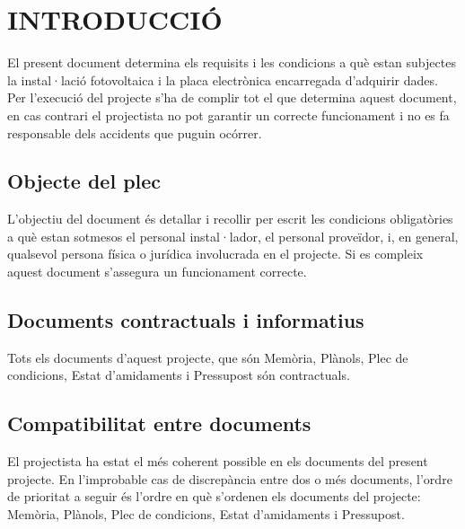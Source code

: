 \chapter{\uppercase{Introducció}}
El present document determina els requisits i les condicions a què estan subjectes la instal·lació fotovoltaica i la placa electrònica encarregada d'adquirir dades. Per l'execució del projecte s'ha de complir tot el que determina aquest document, en cas contrari el projectista no pot garantir un correcte funcionament i no es fa responsable dels accidents que puguin ocórrer.

\section{Objecte del plec}
L'objectiu del document és detallar i recollir per escrit les condicions obligatòries a què estan sotmesos el personal instal·lador, el personal proveïdor, i, en general, qualsevol persona física o jurídica involucrada en el projecte. Si es compleix aquest document s'assegura un funcionament correcte.


\section{Documents contractuals i informatius}
Tots els documents d'aquest projecte, que són Memòria, Plànols, Plec de condicions, Estat d'amidaments i Pressupost són contractuals. 


\section{Compatibilitat entre documents} %
El projectista ha estat el més coherent possible en els documents del present projecte. En l'improbable cas de discrepància entre dos o més documents, l'ordre de prioritat a seguir és l'ordre en què s'ordenen els documents del projecte: Memòria, Plànols, Plec de condicions, Estat d'amidaments i Pressupost.


\clearpage


